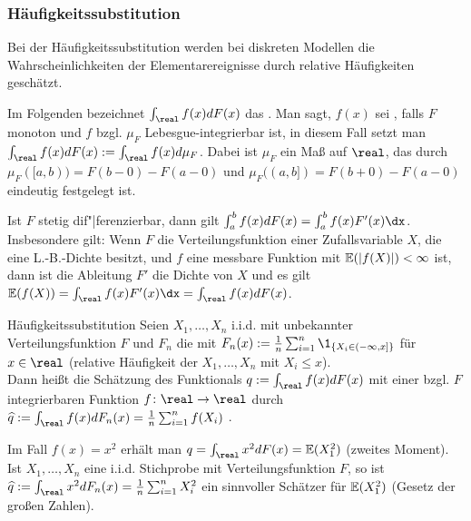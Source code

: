 \subsubsection{%
    Häufigkeitssubstitution%
}

\begin{Bem}
    Bei der Häufigkeitssubstitution werden bei diskreten Modellen die Wahrscheinlichkeiten
    der Elementarereignisse durch relative Häufigkeiten geschätzt.
    
    Im Folgenden bezeichnet $\int_\real f(x) dF(x)$ das
    .
    Man sagt, $f(x)$ sei , falls $F$ monoton und
    $f$ bzgl. $\mu_F$ Lebesgue-integrierbar ist, in diesem Fall setzt man
    $\int_\real f(x) dF(x) := \int_\real f(x) d\mu_F$.
    Dabei ist $\mu_F$ ein Maß auf $\real$, das durch
    $\mu_F([a, b)) = F(b-0) - F(a-0)$ und
    $\mu_F((a, b]) = F(b+0) - F(a-0)$ eindeutig festgelegt ist.
    
    Ist $F$ stetig dif"|ferenzierbar, dann gilt $\int_a^b f(x) dF(x) = \int_a^b f(x)F'(x) \dx$.
    Insbesondere gilt:
    Wenn $F$ die Verteilungsfunktion einer Zufallsvariable $X$, die eine L.-B.-Dichte besitzt,
    und $f$ eine messbare Funktion mit $\mathbb{E}(|f(X)|) < \infty$ ist,
    dann ist die Ableitung $F'$ die Dichte von $X$ und es gilt
    $\EE(f(X)) = \int_\real f(x)F'(x) \dx = \int_\real f(x) dF(x)$.
\end{Bem}

\linie

\begin{Def}{Häufigkeitssubstitution}
    Seien $X_1, \dotsc, X_n$ i.i.d. mit unbekannter Verteilungsfunktion $F$
    und $F_n$ die  mit
    $F_n(x) := \frac{1}{n} \sum_{i=1}^n \1_{\{X_i \in (-\infty, x]\}}$ für $x \in \real$
    (relative Häufigkeit der $X_1, \dotsc, X_n$ mit $X_i \le x$).\\
    Dann heißt die Schätzung des Funktionals $q := \int_\real f(x) dF(x)$
    mit einer bzgl. $F$ integrierbaren Funktion $f\colon \real \rightarrow \real$ durch
    $\widehat{q} := \int_\real f(x) dF_n(x) = \frac{1}{n} \sum_{i=1}^n f(X_i)$
    .
\end{Def}

\linie

\begin{Bsp}
    Im Fall $f(x) = x^2$ erhält man $q = \int_\real x^2 dF(x) = \EE(X_1^2)$ (zweites Moment).
    Ist $X_1, \dotsc, X_n$ eine i.i.d. Stichprobe mit Verteilungsfunktion $F$, so ist\\
    $\widehat{q} := \int_\real x^2 dF_n(x) = \frac{1}{n} \sum_{i=1}^n X_i^2$
    ein sinnvoller Schätzer für $\mathbb{E}(X_1^2)$ (Gesetz der großen Zahlen).
\end{Bsp}

